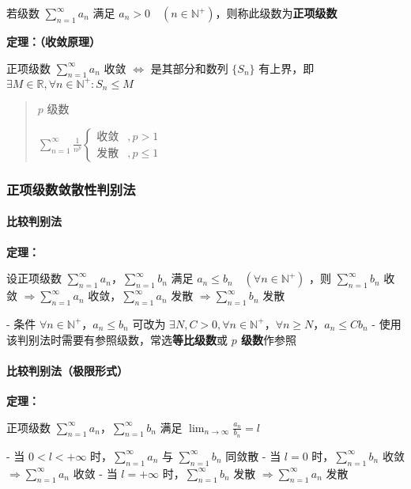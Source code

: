\documentclass[lang = zh , final , oneside , openany , titlepage , zihao = -4 , linespread = 1.3 , baselineskip = false , cjk-font = windows , text-font = newtx , math-font = newtx]{sjtureport}
\begin{document}
若级数 \(\sum_{n = 1}^\infty a_n\) 满足 \(a_n > 0 \quad \left(n\in\mathbb{N}^+\right)\)，则称此级数为\textbf{正项级数}

\textbf{定理：（收敛原理）}

正项级数 \(\sum_{n = 1}^\infty a_n\) 收敛 \(\Leftrightarrow\) 是其部分和数列 \(\{S_n\}\) 有上界，即 \(\exists M\in\mathbb{R},\forall n \in \mathbb{N}^+:S_n \leq M\)

\begin{quote}
\(p\) 级数

\(\sum_{n = 1}^\infty \frac{1}{n^p} \begin{cases}\text{收敛} & ,p > 1\\ \text{发散} & ,p \leq 1\end{cases}\)
\end{quote}

\subsubsection{正项级数敛散性判别法}

\paragraph{比较判别法}

\textbf{定理：}

设正项级数 \(\sum_{n = 1}^\infty a_n\)，\(\sum_{n = 1}^\infty b_n\) 满足 \(a_n \leq b_n \quad (\forall n \in \mathbb{N}^+)\) ，则 \(\sum_{n = 1}^\infty b_n\) 收敛 \(\Rightarrow \sum_{n = 1}^\infty a_n\) 收敛，\(\sum_{n = 1}^\infty a_n\) 发散 \(\Rightarrow \sum_{n = 1}^\infty b_n\) 发散

- 条件 \(\forall n \in \mathbb{N}^+，a_n \leq b_n\) 可改为 \(\exists N,C > 0  ,\forall n\in \mathbb{N}^+，\forall n \geq N，a_n \leq Cb_n\)
- 使用该判别法时需要有参照级数，常选\textbf{等比级数}或 \textbf{\(p\) 级数}作参照

\paragraph{比较判别法（极限形式）}

\textbf{定理：}

正项级数 \(\sum_{n = 1}^\infty a_n\)，\(\sum_{n = 1}^\infty b_n\) 满足 \(\lim_{n\to\infty} \frac{a_n}{b_n} = l\)

- 当 \(0 < l < +\infty\) 时，\(\sum_{n = 1}^\infty a_n\) 与 \(\sum_{n = 1}^\infty b_n\) 同敛散
- 当 \(l = 0\) 时，\(\sum_{n = 1}^\infty b_n\) 收敛 \(\Rightarrow \sum_{n = 1}^\infty a_n\) 收敛
- 当 \(l = +\infty\) 时，\(\sum_{n = 1}^\infty b_n\) 发散 \(\Rightarrow \sum_{n = 1}^\infty a_n\) 发散
\end{document}
